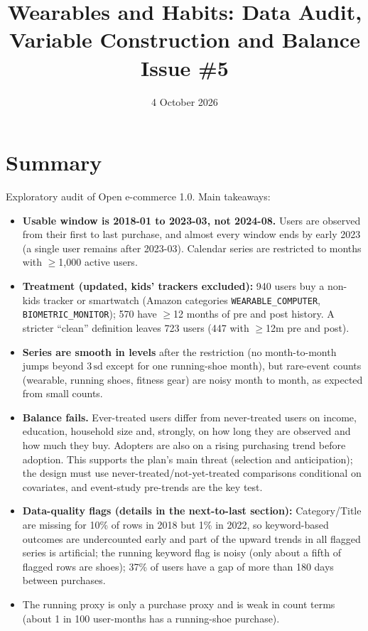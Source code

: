 \documentclass[11pt]{article}
\title{Wearables and Habits: Data Audit, Variable Construction and Balance\\\large Issue \#5}
\date{4 October 2026}
\author{}
\begin{document}
\maketitle

\section{Summary}
Exploratory audit of Open e-commerce 1.0. Main takeaways:
\begin{itemize}[nosep]
\item \textbf{Usable window is 2018-01 to 2023-03, not 2024-08.} Users are observed from their first to last purchase, and almost every window ends by early 2023 (a single user remains after 2023-03). Calendar series are restricted to months with $\geq$1{,}000 active users.
\item \textbf{Treatment (updated, kids' trackers excluded):} 940 users buy a non-kids tracker or smartwatch (Amazon categories \texttt{WEARABLE\_COMPUTER}, \texttt{BIOMETRIC\_MONITOR}); 570 have $\geq$12 months of pre and post history. A stricter ``clean'' definition leaves 723 users (447 with $\geq$12m pre and post).
\item \textbf{Series are smooth in levels} after the restriction (no month-to-month jumps beyond $3\,\mathrm{sd}$ except for one running-shoe month), but rare-event counts (wearable, running shoes, fitness gear) are noisy month to month, as expected from small counts.
\item \textbf{Balance fails.} Ever-treated users differ from never-treated users on income, education, household size and, strongly, on how long they are observed and how much they buy. Adopters are also on a rising purchasing trend before adoption. This supports the plan's main threat (selection and anticipation); the design must use never-treated/not-yet-treated comparisons conditional on covariates, and event-study pre-trends are the key test.
\item \textbf{Data-quality flags (details in the next-to-last section):} Category/Title are missing for 10\% of rows in 2018 but 1\% in 2022, so keyword-based outcomes are undercounted early and part of the upward trends in all flagged series is artificial; the running keyword flag is noisy (only about a fifth of flagged rows are shoes); 37\% of users have a gap of more than 180 days between purchases.
\item The running proxy is only a purchase proxy and is weak in count terms (about 1 in 100 user-months has a running-shoe purchase).
\end{itemize}
\end{document}
